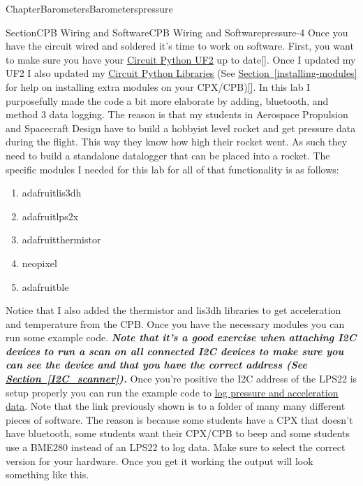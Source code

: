 \documentclass[oneside,10pt,]{book}
\newcommand{\xreffont}{\relax}
\newcommand{\linkhilite}[1]{\underline{#1}}
\newcommand{\alert}[1]{\textbf{\textit{#1}}}
\numberwithin{equation}{section}
\begin{document}
\begin{chapterptx}{Chapter}{Barometers}{}{Barometers}{}{}{pressure}
\begin{sectionptx}{Section}{CPB Wiring and Software}{}{CPB Wiring and Software}{}{}{pressure-4}
Once you have the circuit wired and soldered it's time to work on software. First, you want to make sure you have your \href{https://circuitpython.org/downloads}{\linkhilite{Circuit Python UF2}} up to date\hyperlink{CircuitPython}{\linkhilite{[{\xreffont 30}]}}. Once I updated my UF2 I also updated my \href{https://circuitpython.org/libraries}{\linkhilite{Circuit Python Libraries}} (See \hyperref[installing-modules]{\linkhilite{Section~{\xreffont\ref{installing-modules}}}} for help on installing extra modules on your CPX\slash{}CPB)\hyperlink{CircuitPython}{\linkhilite{[{\xreffont 30}]}}. In this lab I purposefully made the code a bit more elaborate by adding, bluetooth, and method 3 data logging. The reason is that my students in Aerospace Propulsion and Spacecraft Design have to build a hobbyist level rocket and get pressure data during the flight. This way they know how high their rocket went. As such they need to build a standalone datalogger that can be placed into a rocket. The specific modules I needed for this lab for all of that functionality is as follows:%
\begin{enumerate}
\item{}adafruit\textunderscore{}lis3dh%
\item{}adafruit\textunderscore{}lps2x%
\item{}adafruit\textunderscore{}thermistor%
\item{}neopixel%
\item{}adafruit\textunderscore{}ble%
\end{enumerate}
%
\par
Notice that I also added the thermistor and lis3dh libraries to get acceleration and temperature from the CPB. Once you have the necessary modules you can run some example code. \alert{Note that it's a good exercise when attaching I2C devices to run a scan on all connected I2C devices to make sure you can see the device and that you have the correct address (See \hyperref[I2C_scanner]{\linkhilite{Section~{\xreffont\ref{I2C_scanner}}}}).} Once you're positive the I2C address of the LPS22 is setup properly you can run the example code to \href{https://github.com/cmontalvo251/Microcontrollers/tree/master/Circuit_Playground/CircuitPython/Pressure_Accel_Datalogging}{\linkhilite{log pressure and acceleration data}}. Note that the link previously shown is to a folder of many many different pieces of software. The reason is because some students have a CPX that doesn't have bluetooth, some students want their CPX\slash{}CPB to beep and some students use a BME280 instead of an LPS22 to log data. Make sure to select the correct version for your hardware. Once you get it working the output will look something like this.%

\end{sectionptx}
\end{chapterptx}
\end{document}
